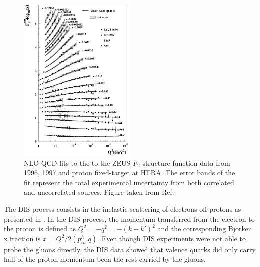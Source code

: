 \begin{figure}[htbp]
 \begin{center}
  \includegraphics[width=0.5\textwidth]{Figures/WBoson/Theory/Structure_Function.png}
 \end{center}
\caption{NLO QCD fits to the to the ZEUS $F_{2}$ structure function data from 1996, 1997 and proton fixed-target at HERA. The error bands of the fit represent the total experimental uncertainty from both correlated and uncorrelated sources. Figure taken from Ref.~\cite{HERAStrucFunc}}
 \label{fig:HERAStrucFunc}
\end{figure}

The DIS process consists in the inelastic scattering of electrons off protons as presented in . In the DIS process, the momentum transferred from the electron to the proton is defined as $Q^{2} = -q^{2} = -\left(k - k'\right)^{2}$ and the corresponding Bjorken x fraction is $x = {Q^{2}}\big/{2\left(p^{h}_{in}.q\right)}$. Even though DIS experiments were not able to probe the gluons directly, the DIS data showed that valence quarks did only carry half of the proton momentum been the rest carried by the gluons.


